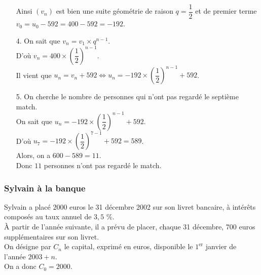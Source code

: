 \begin{itemize}
\vspace*{.3cm}

Ainsi $\left(v_n\right)$ est bien une suite géométrie de raison $q = \dfrac{1}{2}$ et de premier terme \\ $v_0 = u_0 - 592 = 400 - 592 = -192$. \\

\item[4.] On sait que $v_n = v_1 \times q^{n-1}$. \\

D'où $v_n = 400 \times \left(\dfrac{1}{2}\right)^{n-1}$. \\

Il vient que $u_n = v_n + 592 \Longleftrightarrow u_n = -192 \times \left(\dfrac{1}{2}\right)^{n-1} + 592$. \vspace*{.3cm} \\

\item[5.] On cherche le nombre de personnes qui n'ont pas regardé le septième match. \\

On sait que $u_n = -192 \times \left(\dfrac{1}{2}\right)^{n-1} + 592$. \\

D'où $u_7 = -192 \times \left(\dfrac{1}{2}\right)^{7-1} + 592 = 589$. \\

Alors, on a $600 - 589 = 11$. \\

Donc $11$ personnes n'ont pas regardé le match.

\end{itemize}

\newpage

\subsubsection{Sylvain à la banque}

Sylvain a placé $2000$ euros le 31 décembre 2002 sur son livret bancaire, à intérêts composés au taux annuel de $3,5$ \%. \\

À partir de l'année suivante, il a prévu de placer, chaque 31 décembre, 700 euros supplémentaires sur son livret. \\

On désigne par $C_n$ le capital, exprimé en euros, disponible le $1^{\mathrm{er}}$ janvier de l'année $2003 + n$. \\ On a donc $C_0 = 2000$. \\

